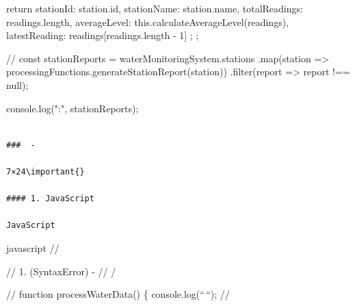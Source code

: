 {{{        return {
            stationId: station.id,
            stationName: station.name,
            totalReadings: readings.length,
            averageLevel: this.calculateAverageLevel(readings),
            latestReading: readings[readings.length - 1]
        };
    }
};

// 
const stationReports = waterMonitoringSystem.stations
    .map(station => processingFunctions.generateStationReport(station))
    .filter(report => report !== null);

console.log(":", stationReports);
\begin{lstlisting}

###  - 

7×24\important{}

#### 1. JavaScript

JavaScript

\end{lstlisting}javascript
// 

// 1.  (SyntaxError) - 
// 
/} // function processWaterData() \{ console.log(``\,``); //
